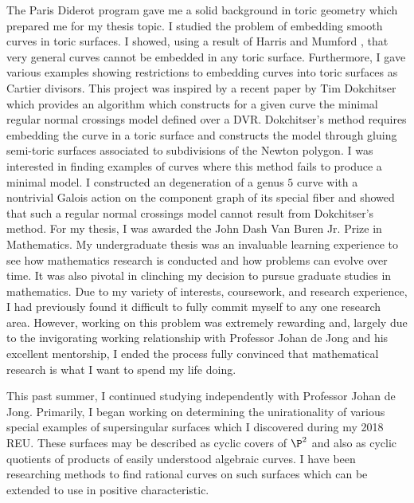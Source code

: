 \documentclass[11pt]{amsart}
\begin{document}
The Paris Diderot program gave me a solid background in toric geometry which prepared me for my thesis topic. I studied the problem of embedding smooth curves in toric surfaces. I showed, using a result of Harris and Mumford \cite{harris1982kodaira}, that very general curves cannot be embedded in any toric surface. Furthermore, I gave various examples showing restrictions to embedding curves into toric surfaces as Cartier divisors. This project was inspired by a recent paper by Tim Dokchitser \cite{models_of_curves} which provides an algorithm which constructs for a given curve the minimal regular normal crossings model defined over a DVR. Dokchitser's method requires embedding the curve in a toric surface and constructs the model through gluing semi-toric surfaces associated to subdivisions of the Newton polygon. I was interested in finding examples of curves where this method fails to produce a minimal model. I constructed an degeneration of a genus $5$ curve with a nontrivial Galois action on the component graph of its special fiber and showed that such a regular normal crossings model cannot result from Dokchitser's method. For my thesis, I was awarded the John Dash Van Buren Jr. Prize in Mathematics. My undergraduate thesis was an invaluable learning experience to see how mathematics research is conducted and how problems can evolve over time. It was also pivotal in clinching my decision to pursue graduate studies in mathematics. Due to my variety of interests, coursework, and research experience, I had previously found it difficult to fully commit myself to any one research area. However, working on this problem was extremely rewarding and, largely due to the invigorating working relationship with Professor Johan de Jong and his excellent mentorship, I ended the process fully convinced that mathematical research is what I want to spend my life doing.
\par 
This past summer, I continued studying independently with Professor Johan de Jong. Primarily, I began working on determining the unirationality of various special examples of supersingular surfaces which I discovered during my 2018 REU. These surfaces may be described as cyclic covers of $\P^2$ and also as cyclic quotients of products of easily understood algebraic curves. I have been researching methods to find rational curves on such surfaces which can be extended to use in positive characteristic.
\par
\end{document}
